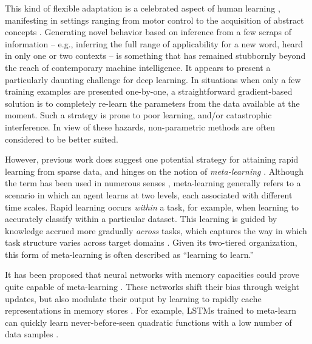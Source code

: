 \documentclass{article}
\begin{document}
This kind of flexible adaptation is a celebrated aspect of human learning \cite{jankowski2011meta}, manifesting in settings ranging from motor control \cite{braun2009motor} to the acquisition of abstract concepts \cite{lake2015human}. Generating novel behavior based on inference from a few scraps of information -- e.g., inferring the full range of applicability for a new word, heard in only one or two contexts -- is something that has remained stubbornly beyond the reach of contemporary machine intelligence. It appears to present a particularly daunting challenge for deep learning. In situations when only a few training examples are presented one-by-one, a straightforward gradient-based solution is to completely re-learn the parameters from the data available at the moment. Such a strategy is prone to poor learning, and/or catastrophic interference. In view of these hazards, non-parametric methods are often considered to be better suited.

However, previous work does suggest one potential strategy for attaining rapid learning from sparse data, and hinges on the notion of \textit{meta-learning} \cite{thrun1998lifelong,vilalta2002perspective}. Although the term has been used in numerous senses \cite{schmidhuber1997shifting,caruana1997multitask,schweighofer2003meta,brazdil2003ranking}, meta-learning generally refers to a scenario in which an agent learns at two levels, each associated with different time scales. Rapid learning occurs \textit{within} a task, for example, when learning to accurately classify within a particular dataset. This learning is guided by knowledge accrued more gradually \textit{across} tasks, which captures the way in which task structure varies across target domains \cite{giraud2004introduction,rendell1987layered,thrun1998lifelong}. Given its two-tiered organization, this form of meta-learning is often described as ``learning to learn.''

It has been proposed that neural networks with memory capacities could prove quite capable of meta-learning \cite{hochreiter2001learning}. These networks shift their bias through weight updates, but also modulate their output by learning to rapidly cache representations in memory stores \cite{hochreiter1997long}. For example, LSTMs trained to meta-learn can quickly learn never-before-seen quadratic functions with a low number of data samples \cite{hochreiter2001learning}. 
\end{document}
